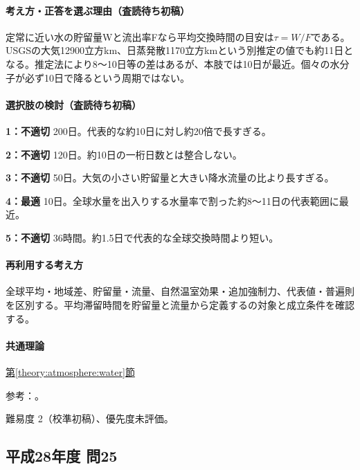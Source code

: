 \paragraph{考え方・正答を選ぶ理由（査読待ち初稿）} 定常に近い水の貯留量Wと流出率Fなら平均交換時間の目安は\(\tau=W/F\)である。USGSの大気12900立方km、日蒸発散1170立方kmという別推定の値でも約11日となる。推定法により8〜10日等の差はあるが、本肢では10日が最近。個々の水分子が必ず10日で降るという周期ではない。

\paragraph{選択肢の検討（査読待ち初稿）}\mbox{}\par

\noindent\textbf{1：不適切} 200日。代表的な約10日に対し約20倍で長すぎる。\par

\noindent\textbf{2：不適切} 120日。約10日の一桁日数とは整合しない。\par

\noindent\textbf{3：不適切} 50日。大気の小さい貯留量と大きい降水流量の比より長すぎる。\par

\noindent\textbf{4：最適} 10日。全球水量を出入りする水量率で割った約8〜11日の代表範囲に最近。\par

\noindent\textbf{5：不適切} 36時間。約1.5日で代表的な全球交換時間より短い。\par

\paragraph{再利用する考え方} 全球平均・地域差、貯留量・流量、自然温室効果・追加強制力、代表値・普遍則を区別する。平均滞留時間を貯留量と流量から定義するの対象と成立条件を確認する。

\paragraph{共通理論} \hyperref[theory:atmosphere:water]{第\ref*{theory:atmosphere:water}節}

\par 参考：\cite{atm_usgs_water,atm_usgs_cycle}。

\par 難易度 2（校準初稿）、優先度未評価。

\subsection{平成28年度 問25}
\label{q:h28-reg-applied-25}

